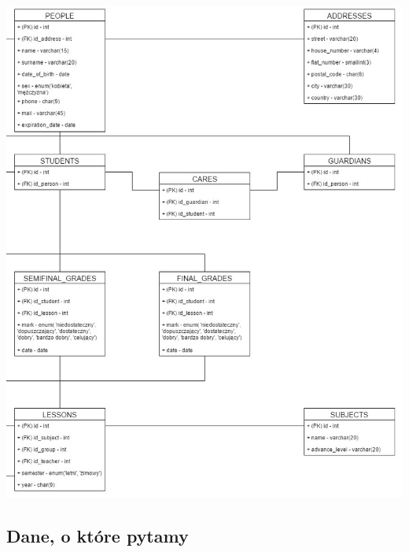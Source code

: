 \documentclass[12pt, titlepage]{article}
\begin{document}
\begin{center}
\includegraphics[scale=0.5]{screeny/relational2.jpg}
\end{center}

\subsection{Dane, o które pytamy}
\end{document}

